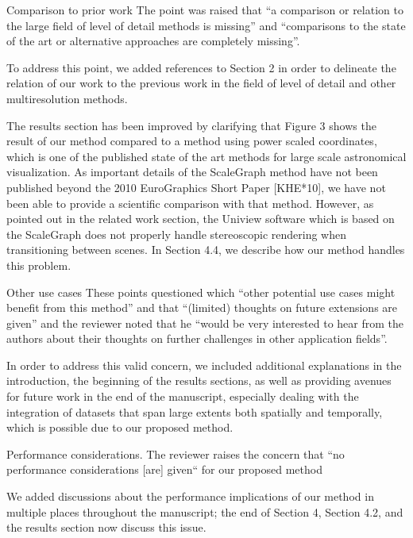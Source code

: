 \documentclass{article}
\begin{document}
\vspace*{1cm}


\begin{tcolorbox}
{\large Comparison to prior work}  The point was raised that ``a comparison or relation to the large field of level of detail methods is missing'' and ``comparisons to the state of the art or alternative approaches are completely missing''.
\end{tcolorbox}
To address this point, we added references to Section 2 in order to delineate the relation of our work to the previous work in the field of level of detail and other multiresolution methods.

The results section has been improved by clarifying that Figure 3 shows the result of our method compared to a method using power scaled coordinates, which is one of the published state of the art methods for large scale astronomical visualization.
As important details of the ScaleGraph method have not been published beyond the 2010 EuroGraphics Short Paper [KHE*10], we have not been able to provide a scientific comparison with that method.
However, as pointed out in the related work section, the Uniview software which is based on the ScaleGraph does not properly handle stereoscopic rendering when transitioning between scenes.
In Section 4.4, we describe how our method handles this problem.

\vspace*{1cm}

\begin{tcolorbox}
{\large Other use cases} These points questioned which ``other potential use cases might benefit from this method'' and that ``(limited) thoughts on future extensions are given'' and the reviewer noted that he ``would be very interested to hear from the authors about their thoughts on further challenges in other application fields''.
\end{tcolorbox}
In order to address this valid concern, we included additional explanations in the
introduction, the beginning of the results sections, as well as providing avenues for
future work in the end of the manuscript, especially dealing with the integration of datasets that span large extents both spatially and temporally, which is possible due to our proposed method.

\vspace*{1cm}

\begin{tcolorbox}
{\large Performance considerations}. The reviewer raises the concern that ``no performance considerations [are] given`` for our proposed method
\end{tcolorbox}
We added discussions about the performance implications of our method in multiple places throughout the manuscript; the end of Section 4, Section 4.2, and the results section now discuss this issue.
\end{document}
